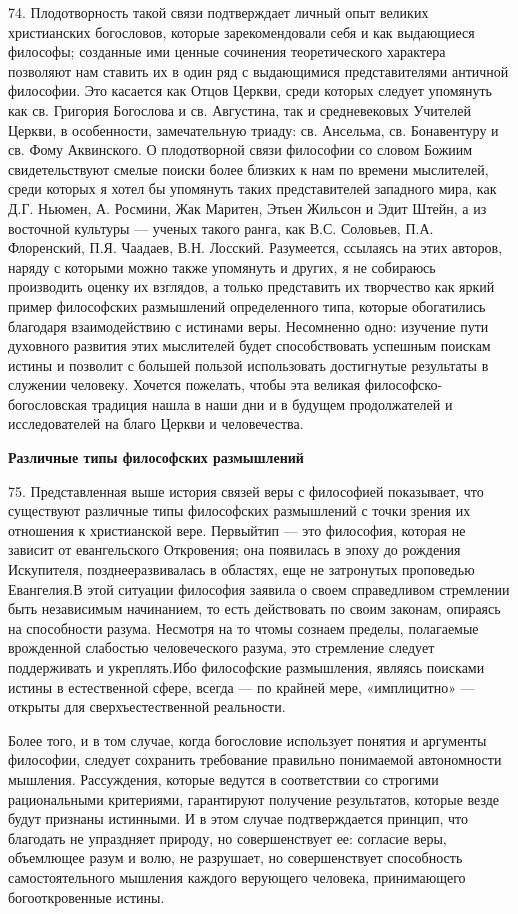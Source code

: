 \documentclass[a5paper,10pt]{article}
\begin{document}
74. Плодотворность такой связи подтверждает личный опыт великих христианских
богословов, которые зарекомендовали себя и как выдающиеся философы; созданные
ими ценные сочинения теоретического характера позволяют нам ставить их в один
ряд с выдающимися представителями античной философии. Это касается как Отцов
Церкви, среди которых следует упомянуть как св. Григория Богослова и св.
Августина, так и средневековых Учителей Церкви, в особенности, замечательную
триаду: св. Ансельма, св. Бонавентуру и св. Фому Аквинского. О плодотворной
связи философии со словом Божиим свидетельствуют смелые поиски более близких к
нам по времени мыслителей, среди которых я хотел бы упомянуть таких
представителей западного мира, как Д.Г. Ньюмен, А. Росмини, Жак Маритен, Этьен
Жильсон и Эдит Штейн, а из восточной культуры — ученых такого ранга, как В.С.
Соловьев, П.А. Флоренский, П.Я. Чаадаев, В.Н. Лосский. Разумеется, ссылаясь на
этих авторов, наряду с которыми можно также упомянуть и других, я не собираюсь
производить оценку их взглядов, а только представить их творчество как яркий
пример философских размышлений определенного типа, которые обогатились
благодаря взаимодействию с истинами веры. Несомненно одно: изучение пути
духовного развития этих мыслителей будет способствовать успешным поискам истины
и позволит с большей пользой использовать достигнутые результаты в служении
человеку. Хочется пожелать, чтобы эта великая философско-богословская традиция
нашла в наши дни и в будущем продолжателей и исследователей на благо Церкви и
человечества.

\textbf{Различные типы философских размышлений}

75. Представленная выше история связей веры с философией показывает, что
существуют различные типы философских размышлений с точки зрения их отношения к
христианской вере. Первыйтип — это философия, которая не зависит от
евангельского Откровения; она появилась в эпоху до рождения Искупителя,
позднееразвивалась в областях, еще не затронутых проповедью Евангелия.В этой
ситуации философия заявила о своем справедливом стремлении быть независимым
начинанием, то есть действовать по своим законам, опираясь на способности
разума. Несмотря на то чтомы сознаем пределы, полагаемые врожденной слабостью
человеческого разума, это стремление следует поддерживать и укреплять.Ибо
философские размышления, являясь поисками истины в естественной сфере, всегда —
по крайней мере, «имплицитно» — открыты для сверхъестественной реальности.

Более того, и в том случае, когда богословие использует понятия и аргументы
философии, следует сохранить требование правильно понимаемой автономности
мышления. Рассуждения, которые ведутся в соответствии со строгими рациональными
критериями, гарантируют получение результатов, которые везде будут признаны
истинными. И в этом случае подтверждается принцип, что благодать не упраздняет
природу, но совершенствует ее: согласие веры, объемлющее разум и волю, не
разрушает, но совершенствует способность самостоятельного мышления каждого
верующего человека, принимающего богооткровенные истины.
\end{document}
